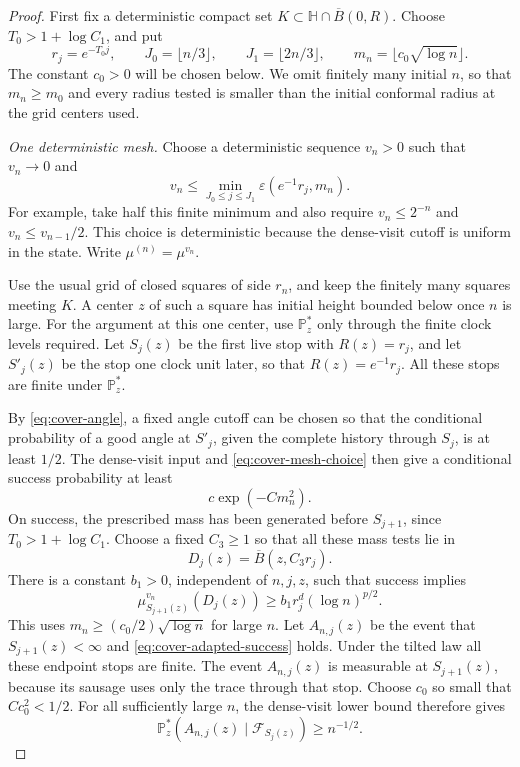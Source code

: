 \begin{proof}
First fix a deterministic compact set
\(K\subset\mathbb H\cap\overline B(0,R)\).
Choose \(T_0>1+\log C_1\), and put
\[
 r_j=e^{-T_0j},\qquad
 J_0=\lfloor n/3\rfloor,\qquad J_1=\lfloor2n/3\rfloor,
 \qquad m_n=\lfloor c_0\sqrt{\log n}\rfloor.
\]
The constant \(c_0>0\) will be chosen below.  We omit finitely many
initial \(n\), so that \(m_n\ge m_0\) and every radius tested is
smaller than the initial conformal radius at the grid centers used.

\emph{One deterministic mesh.}
Choose a deterministic sequence \(v_n>0\) such that \(v_n\to0\)
and
\begin{equation}
 v_n\le\min_{J_0\le j\le J_1}
              \varepsilon(e^{-1}r_j,m_n).
 \label{eq:cover-mesh-choice}
\end{equation}
For example, take half this finite minimum and also require
\(v_n\le2^{-n}\) and \(v_n\le v_{n-1}/2\).  This choice is
deterministic because the dense-visit cutoff is uniform in the
state.  Write \(\mu^{(n)}=\mu^{v_n}\).

Use the usual grid of closed squares of side \(r_n\), and keep
the finitely many squares meeting \(K\).  A center \(z\) of such
a square has initial height bounded below once \(n\) is large.
For the argument at this one center, use \(\mathbb P_z^*\) only
through the finite clock levels required.  Let \(S_j(z)\) be the
first live stop with \(R(z)=r_j\), and let \(S'_j(z)\) be the
stop one clock unit later, so that \(R(z)=e^{-1}r_j\).
All these stops are finite under \(\mathbb P_z^*\).

By \eqref{eq:cover-angle}, a fixed angle cutoff can be chosen
so that the conditional probability of a good angle at \(S'_j\),
given the complete history through \(S_j\), is at least \(1/2\).
The dense-visit input and \eqref{eq:cover-mesh-choice} then give
a conditional success probability at least
\[
 c\exp(-Cm_n^2).
\]
On success, the prescribed mass has been generated before
\(S_{j+1}\), since \(T_0>1+\log C_1\).  Choose a fixed
\(C_3\ge1\) so that all these mass tests lie in
\[
 D_j(z)=\overline B(z,C_3r_j).
\]
There is a constant \(b_1>0\), independent of \(n,j,z\), such that
success implies
\begin{equation}
 \mu_{S_{j+1}(z)}^{v_n}(D_j(z))
     \ge b_1 r_j^d(\log n)^{p/2}.
 \label{eq:cover-adapted-success}
\end{equation}
This uses \(m_n\ge(c_0/2)\sqrt{\log n}\) for large \(n\).
Let \(A_{n,j}(z)\) be the event that \(S_{j+1}(z)<\infty\) and
\eqref{eq:cover-adapted-success} holds. Under the tilted law all these
endpoint stops are finite. The event \(A_{n,j}(z)\) is measurable at
\(S_{j+1}(z)\), because its sausage uses only the trace through that stop.
Choose \(c_0\) so small that \(Cc_0^2<1/2\).  For all sufficiently
large \(n\), the dense-visit lower bound therefore gives
\[
 \mathbb P_z^*\!\left(A_{n,j}(z)\mid\mathcal F_{S_j(z)}\right)
       \ge n^{-1/2}.
\]


\end{proof}
